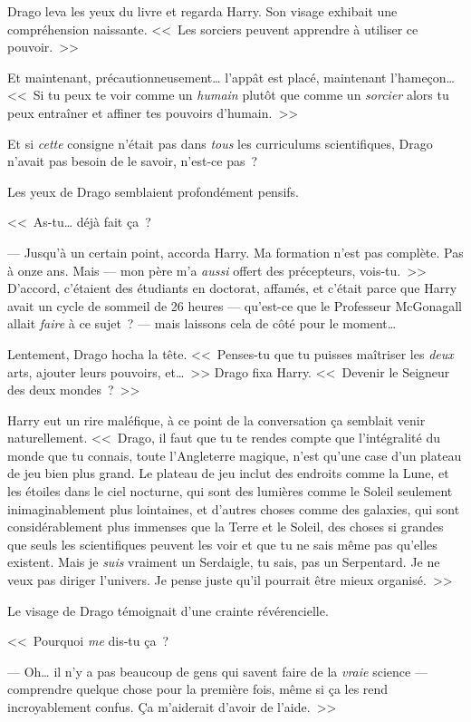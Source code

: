 Drago leva les yeux du livre et regarda Harry. Son visage exhibait une compréhension naissante. <<~Les sorciers peuvent apprendre à utiliser ce pouvoir.~>>

Et maintenant, précautionneusement… l'appât est placé, maintenant l'hameçon… <<~Si tu peux te voir comme un \emph{humain} plutôt que comme un \emph{sorcier} alors tu peux entraîner et affiner tes pouvoirs d'humain.~>>

Et si \emph{cette} consigne n'était pas dans \emph{tous} les curriculums scientifiques, Drago n'avait pas besoin de le savoir, n'est-ce pas~?

Les yeux de Drago semblaient profondément pensifs.

<<~As-tu… déjà fait ça~?

--- Jusqu'à un certain point, accorda Harry. Ma formation n'est pas complète. Pas à onze ans. Mais — mon père m'a \emph{aussi} offert des précepteurs, vois-tu.~>> D'accord, c'étaient des étudiants en doctorat, affamés, et c'était parce que Harry avait un cycle de sommeil de 26 heures — qu'est-ce que le Professeur McGonagall allait \emph{faire} à ce sujet~? — mais laissons cela de côté pour le moment…

Lentement, Drago hocha la tête. <<~Penses-tu que tu puisses maîtriser les \emph{deux} arts, ajouter leurs pouvoirs, et…~>> Drago fixa Harry. <<~Devenir le Seigneur des deux mondes~?~>>

Harry eut un rire maléfique, à ce point de la conversation ça semblait venir naturellement. <<~Drago, il faut que tu te rendes compte que l'intégralité du monde que tu connais, toute l'Angleterre magique, n'est qu'une case d'un plateau de jeu bien plus grand. Le plateau de jeu inclut des endroits comme la Lune, et les étoiles dans le ciel nocturne, qui sont des lumières comme le Soleil seulement inimaginablement plus lointaines, et d'autres choses comme des galaxies, qui sont considérablement plus immenses que la Terre et le Soleil, des choses si grandes que seuls les scientifiques peuvent les voir et que tu ne sais même pas qu'elles existent. Mais je \emph{suis} vraiment un Serdaigle, tu sais, pas un Serpentard. Je ne veux pas diriger l'univers. Je pense juste qu'il pourrait être mieux organisé.~>>

Le visage de Drago témoignait d'une crainte révérencielle.

<<~Pourquoi \emph{me} dis-tu ça~?

--- Oh… il n'y a pas beaucoup de gens qui savent faire de la \emph{vraie} science — comprendre quelque chose pour la première fois, même si ça les rend incroyablement confus. Ça m'aiderait d'avoir de l'aide.~>>

